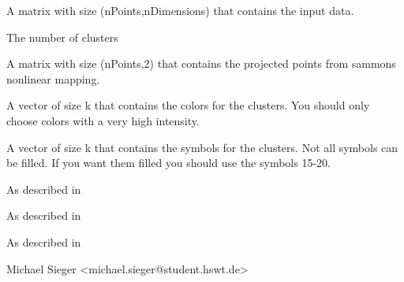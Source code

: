 \documentclass[letterpaper]{book}
\begin{document}
\begin{Arguments}
\begin{ldescription}

\item[\code{X}] 
A matrix with size (nPoints,nDimensions) that contains the input data.


\item[\code{k}] 
The number of clusters


\item[\code{Xs}] 
A matrix with size (nPoints,2) that contains the projected points from sammons nonlinear mapping.


\item[\code{clusterColors}] 
A vector of size k that contains the colors for the clusters. You should only choose colors with a very high intensity.


\item[\code{clusterSymbols}] 
A vector of size k that contains the symbols for the clusters. Not all symbols can be filled. If you want them filled you should use the symbols 15-20.


\item[\code{xlab}] 
As described in 

\item[\code{ylab}] 
As described in 

\item[\code{main}] 
As described in 

\end{ldescription}
\end{Arguments}
%
\begin{Author}\relax
Michael Sieger <michael.sieger@student.hswt.de>
\end{Author}
%
\end{document}
